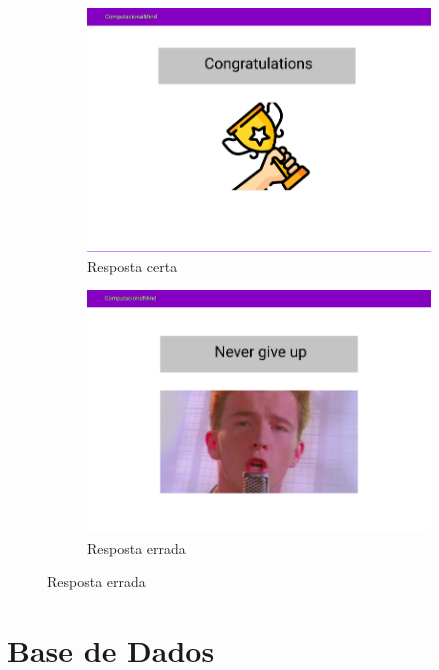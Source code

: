 \documentclass[11pt,a4paper]{report}
\begin{document}
\begin{figure}
    \begin{subfigure}[h!]{0.5\linewidth}
        \includegraphics[width=\linewidth]{MockUserCongratulations.png}
        \caption{Resposta certa}
        \label{fig:MockUserCongratulations}
    \end{subfigure}
    \begin{subfigure}[h!]{0.5\linewidth}
        \includegraphics[width=\linewidth]{MockUserTryAgain.png}
        \caption{Resposta errada}
        \label{fig:MockUserTryAgain}
    \end{subfigure}
\end{figure}

\chapter{Base de Dados}
\end{document}
